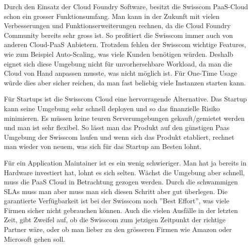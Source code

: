 Durch den Einsatz der Cloud Foundry Software, besitzt die Swisscom PaaS-Cloud schon ein grosser Funktionsumfang. Man kann in der Zukunft mit vielen Verbesserungen und Funktionserweiterungen rechnen, da die Cloud Foundry Community bereits sehr gross ist. So profitiert die Swisscom immer auch von anderen Cloud-PaaS Anbietern. Trotzdem fehlen der Swisscom wichtige Features, wie zum Beispiel Auto-Scaling, was viele Kunden benötigen würden. Deshalb eignet sich diese Umgebung nicht für unvorhersehbare Workload, da man die Cloud von Hand anpassen musste, was nicht möglich ist. Für One-Time Usage würde dies aber sicher reichen, da man fast beliebig viele Instanzen starten kann.

Für Startups ist die Swisscom Cloud eine hervorragende Alternative. Das Startup kann seine Umgebung sehr schnell deployen und so das finanzielle Risiko minimieren. Es müssen keine teuren Serverumgebungen gekauft/gemietet werden und man ist sehr flexibel. So lässt man das Produkt auf den günstigen Paas Umgebung der Swisscom laufen und wenn sich das Produkt etabliert, rechnet man wieder von neuem, was sich für das Startup am Besten lohnt.

Für ein Application Maintainer ist es ein wenig schwieriger. Man hat ja bereits in Hardware investiert hat, lohnt es sich selten. Wächst die Umgebung aber schnell, muss die PaaS Cloud in Betrachtung gezogen werden. Durch die schwammigen SLAs muss man aber muss man sich diesen Schritt aber gut überlegen. Die garantierte Verfügbarkeit ist bei der Swisscom noch ''Best Effort'', was viele Firmen sicher nicht gebrauchen können. Auch die vielen Ausfälle in der letzten Zeit, gibt Zweifel auf, ob die Swisscom zum jetzigen Zeitpunkt der richtige Partner wäre, oder ob man lieber zu den grösseren Firmen wie Amazon oder Microsoft gehen soll.


